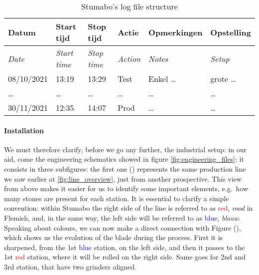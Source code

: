 \begin{table}[ht]
    \centering
    \begin{tabularx}{\textwidth}{llllll}
        \toprule
        Datum & Start tijd & Stop tijd & Actie & Opmerkingen & Opstelling \\\midrule
        \textit{Date} & \textit{Start time} & \textit{Stop time} & \textit{Action} & \textit{Notes} & \textit{Setup} \\\midrule
        08/10/2021 & 13:19 & 13:29 & Test & Enkel \dots & grote \dots \\ %
        \midrule
        \dots & \dots & \dots & \dots & \dots & \dots \\\midrule
        30/11/2021 & 12:35 & 14:07 & Prod & \dots & \dots \\\bottomrule
    \end{tabularx}
    \caption{Stumabo's log file structure}
    \label{tab:stu_logfile}
\end{table}

\paragraph{Installation} We must therefore clarify, before we go any further, the industrial setup: in our aid, come the engineering schematics showed in figure \ref{fig:engineering_files};
it consists in three subfigures: the first one () represents the same production line we saw earlier at \ref{fig:line_overview}, just from another prospective. 
This view from above makes it easier for us to identify some important elements, e.g.\ how many stones are present for each station.
It is essential to clarify a simple convention: within Stumabo the right side of the line is referred to as \textcolor{red}{red}, \textit{rood} in Flemish, and, in the same way, 
the left side will be referred to as \textcolor{blue}{blue}, \textit{blauw}. 
Speaking about colours, we can now make a direct connection with Figure (), which shows us the evolution of the blade during the process.
First it is sharpened, from the 1st \textcolor{blue}{blue} station, on the left side, and then it passes to the 1st \textcolor{red}{red} station, where it will be rolled on the right side. 
Same goes for 2nd and 3rd station, that have two grinders aligned. 

